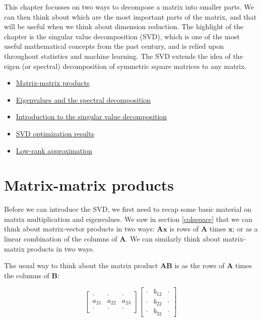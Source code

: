 \documentclass[]{book}
\providecommand{\tightlist}{%
  \setlength{\itemsep}{0pt}\setlength{\parskip}{0pt}}
\theoremstyle{definition}
\theoremstyle{definition}
\theoremstyle{definition}
\theoremstyle{remark}
\begin{document}
This chapter focusses on two ways to decompose a matrix into smaller parts. We can then think about which are the most important parts of the matrix, and that will be useful when we think about dimension reduction. The highlight of the chapter is the singular value decomposition (SVD), which is one of the most useful mathematical concepts from the past century, and is relied upon throughout statistics and machine learning. The SVD extends the idea of the eigen (or spectral) decomposition of symmetric square matrices to any matrix.

\begin{itemize}
\tightlist
\item
  \href{https://mediaspace.nottingham.ac.uk/media/Matrix-matrix+products/1_kelw2beu}{Matrix-matrix products}
\item
  \href{https://mediaspace.nottingham.ac.uk/media/Eigenvalues+and+the+spectral+decomposition/1_drbz1eg8}{Eigenvalues and the spectral decomposition}
\item
  \href{https://mediaspace.nottingham.ac.uk/media/Singular+value+decompositionA+introduction/1_okyjnqic}{Introduction to the singular value decomposition}
\item
  \href{https://mediaspace.nottingham.ac.uk/media/Singular+value+decompositionA+optimization+results/1_9jv8zfw0}{SVD optimization results}
\item
  \href{https://mediaspace.nottingham.ac.uk/media/Singular+value+decompositionA+low+rank+approximation/1_vwbtjdzo}{Low-rank approximation}
\end{itemize}

\hypertarget{matrix-matrix}{%
\section{Matrix-matrix products}\label{matrix-matrix}}

Before we can introduce the SVD, we first need to recap some basic material on matrix multiplication and eigenvalues.
We saw in section \ref{colsspace} that we can think about matrix-vector products in two ways: \(\mathbf A\mathbf x\) is rows of \(\mathbf A\) times \(\mathbf x\); or as a linear combination of the columns of \(\mathbf A\). We can similarly think about matrix-matrix products in two ways.

The usual way to think about the matrix product \(\mathbf A\mathbf B\) is as the rows of \(\mathbf A\) times the columns of \(\mathbf B\):

\[\left[ \begin{array}{ccc}
\cdot & \cdot &\cdot\\
a_{21}&a_{22}&a_{23}\\
\cdot & \cdot &\cdot
\end{array}
\right]\left[\begin{array}{ccc}
\cdot & b_{12} &\cdot\\
\cdot&b_{22}&\cdot\\
\cdot & b_{32} &\cdot
\end{array}
\right]\]
\end{document}
